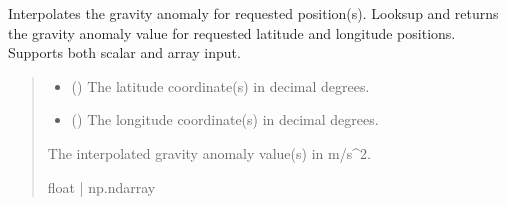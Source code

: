 \documentclass[letterpaper,10pt,english]{sphinxmanual}
\begin{document}
\begin{fulllineitems}
\begin{fulllineitems}
\label{\detokenize{modules/gravity/irish:qnav.gravity.irish.IrishSeaGravity.get_map_value}}
\pysigstartsignatures
{}
\pysigstopsignatures
\sphinxAtStartPar
Interpolates the gravity anomaly for requested position(s).
Looks\sphinxhyphen{}up and returns the gravity anomaly value for requested latitude
and longitude positions. Supports both scalar and array input.
\begin{quote}\begin{description}
\begin{itemize}
\item {} 
\sphinxAtStartPar
{} (\sphinxstyleliteralemphasis{\sphinxupquote{ | }}) \textendash{} The latitude coordinate(s) in decimal degrees.

\item {} 
\sphinxAtStartPar
{} (\sphinxstyleliteralemphasis{\sphinxupquote{ | }}) \textendash{} The longitude coordinate(s) in decimal degrees.

\end{itemize}

\sphinxAtStartPar
The interpolated gravity anomaly value(s) in m/s\textasciicircum{}2.

\sphinxAtStartPar
float | np.ndarray

\end{description}\end{quote}

\end{fulllineitems}



\end{fulllineitems}
\end{document}
